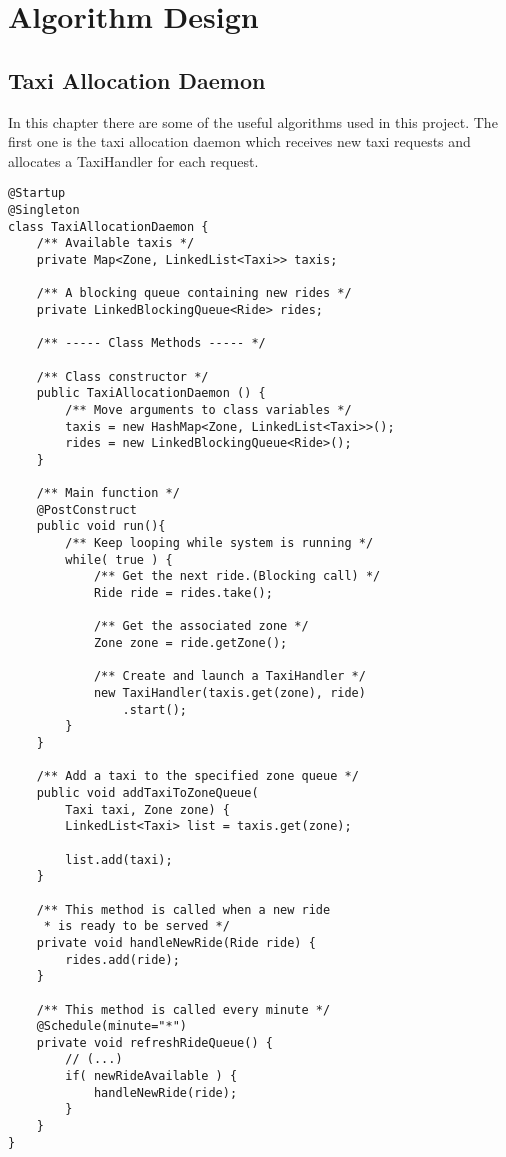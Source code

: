 \pagebreak
\section{Algorithm Design}

\subsection{Taxi Allocation Daemon}
In this chapter there are some of the useful algorithms used in this project.
The first one is the taxi allocation daemon which receives 
new taxi requests and allocates a TaxiHandler for each request.

\lstset{
language=Java,
numbersep=10pt,
numbers=left,
frame=single,
}
\begin{lstlisting}[caption={Taxi allocation daemon}]
@Startup
@Singleton
class TaxiAllocationDaemon {
    /** Available taxis */
    private Map<Zone, LinkedList<Taxi>> taxis;

    /** A blocking queue containing new rides */
    private LinkedBlockingQueue<Ride> rides;

    /** ----- Class Methods ----- */

    /** Class constructor */
    public TaxiAllocationDaemon () { 
        /** Move arguments to class variables */
        taxis = new HashMap<Zone, LinkedList<Taxi>>();
        rides = new LinkedBlockingQueue<Ride>();
    }

    /** Main function */
    @PostConstruct
    public void run(){
        /** Keep looping while system is running */
        while( true ) {
            /** Get the next ride.(Blocking call) */
            Ride ride = rides.take();

            /** Get the associated zone */
            Zone zone = ride.getZone();

            /** Create and launch a TaxiHandler */
            new TaxiHandler(taxis.get(zone), ride)
                .start(); 
        }
    }

    /** Add a taxi to the specified zone queue */
    public void addTaxiToZoneQueue(
        Taxi taxi, Zone zone) {
        LinkedList<Taxi> list = taxis.get(zone);

        list.add(taxi);
    }

    /** This method is called when a new ride
     * is ready to be served */
    private void handleNewRide(Ride ride) {
        rides.add(ride);
    }

    /** This method is called every minute */
    @Schedule(minute="*")
    private void refreshRideQueue() {
        // (...) 
        if( newRideAvailable ) {
            handleNewRide(ride);
        }
    }
}
\end{lstlisting}
\pagebreak

